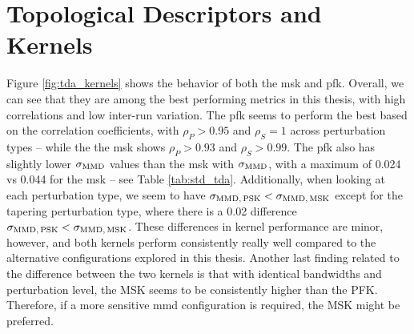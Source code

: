 \begin{table}
  \centering
  \caption[$\sigma_\MMD$ values for the \gls{mmd} using the \gls{esm} learned
embedding.]{$\sigma_\MMD$ values for the \gls{mmd} using the \gls{esm} learned embedding.
$\sigma_\MMD>0.1$ are in bold. These findings corroborate the correlation
coefficients shown in Figure \ref{fig:esm_descriptor}: using a linear kernel or
an RBF kernel with$\sigma<0.1$, we get $\sigma_\MMD<0.1$, we obtain higher
quality (here, more robust) metrics, since $\sigma_\MMD$ is relatively low.}
  \label{tab:std_esm}
\end{table}

\clearpage

\section{Topological Descriptors and Kernels}\label{sec:results_topo_kernels}

Figure \ref{fig:tda_kernels} shows the behavior of both the \gls{msk}
and \gls{pfk}. Overall, we can see that they are among the best
performing metrics in this thesis, with high correlations and low inter-run
variation. The \gls{pfk} seems to perform the best based on the
correlation coefficients, with $\rho_P>0.95$ and $\rho_S=1$ across perturbation
types -- while the the \gls{msk} shows $\rho_P>0.93$ and $\rho_S>0.99$.
The \gls{pfk} also has slightly lower $\sigma_\MMD$ values than
the \gls{msk} with $\sigma_\MMD$, with a maximum of 0.024 vs 0.044 for
the \gls{msk} -- see Table \ref{tab:std_tda}. Additionally, when
looking at each perturbation type, we seem to have $\sigma_{\text{MMD}
  ,\,\text{PSK}}<\sigma_{\text{MMD},\,\text{MSK}}$ except for the tapering
perturbation type, where there is a 0.02 difference $\sigma_{\text{MMD}
,\,\text{PSK}}<\sigma_{\text{MMD},\,\text{MSK}}$. These differences in kernel
performance are minor, however, and both kernels perform consistently really
well compared to the alternative configurations explored in this thesis. Another
last finding related to the difference between the two kernels is that with
identical bandwidths and perturbation level, the MSK seems to be consistently
higher than the PFK. Therefore, if a more sensitive \gls{mmd} configuration is
required, the MSK might be preferred.

